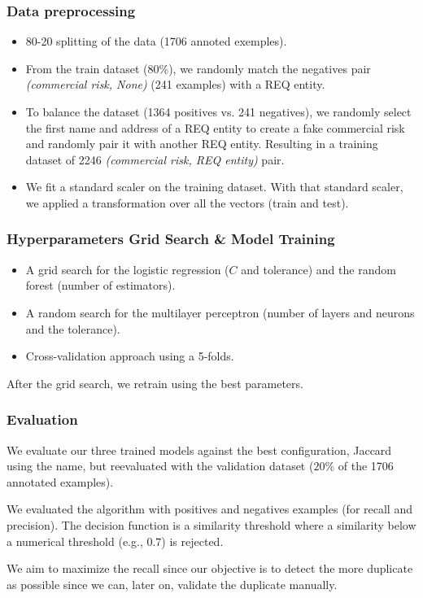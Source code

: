 \documentclass{beamer}
\begin{document}
	\begin{frame}\frametitle{Data preprocessing}
		\begin{itemize}
			\item<1-> 80-20 splitting of the data (\num{1706} annoted exemples).
			\item<2-> From the train dataset ($80\%$), we randomly match the negatives pair \textit{(commercial risk, None)} (241 examples) with a REQ entity.
			\item<3-> To balance the dataset (1364 positives vs. 241 negatives), we randomly select the first name and address of a REQ entity to create a fake commercial risk and randomly pair it with another REQ entity. Resulting in a training dataset of \num{2246} \textit{(commercial risk, REQ entity)} pair.
			\item<4-> We fit a standard scaler on the training dataset. With that standard scaler, we applied a transformation over all the vectors (train and test).
		\end{itemize}	
	\end{frame}

	\begin{frame}\frametitle{Hyperparameters Grid Search \& Model Training}
		\begin{itemize}
			\item A grid search for the logistic regression ($C$ and tolerance) and the random forest (number of estimators).
			\item A random search for the multilayer perceptron (number of layers and neurons and the tolerance).
			\item Cross-validation approach using a 5-folds.
		\end{itemize}	
		After the grid search, we retrain using the best parameters.
	\end{frame}
	
	\begin{frame}\frametitle{Evaluation}
		We evaluate our three trained models against the best configuration, Jaccard using the name, but reevaluated with the validation dataset ($20\%$ of the \num{1706} annotated examples). \\\bigskip
		
		We evaluated the algorithm with positives and negatives examples (for recall and precision). The decision function is a similarity threshold where a similarity below a numerical threshold (e.g., $0.7$) is rejected.\\\bigskip
		
		We aim to maximize the recall since our objective is to detect the more duplicate as possible since we can, later on, validate the duplicate manually. 
	\end{frame}
\end{document}
